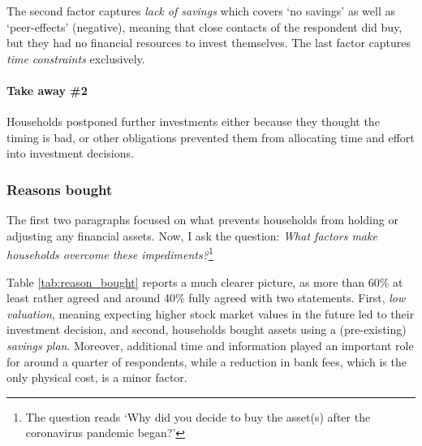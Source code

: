 \documentclass[ProjectABM]{subfiles}
\begin{document}
The second factor captures \textit{lack of savings} which covers `no savings' as well as `peer-effects' (negative), meaning that close contacts of the respondent did buy, but they had no financial resources to invest themselves. The last factor captures \textit{time constraints} exclusively.




\paragraph{Take away \#2}
Households postponed further investments either because they thought the timing is bad, or other obligations prevented them from allocating time and effort into investment decisions. %

\subsubsection{Reasons bought}
The first two paragraphs focused on what prevents households from holding or adjusting any financial assets. Now, I ask the question: \textit{What factors make households overcome these impediments?}\footnote{The question reads `Why did you decide to buy the asset(s) after the coronavirus pandemic began?'}



Table \ref{tab:reason_bought} reports a much clearer picture, as more than 60\% at least rather agreed and around 40\% fully agreed with two statements. First, \textit{low valuation}, meaning expecting higher stock market values in the future led to their investment decision, and second, households bought assets using a (pre-existing) \textit{savings plan}. %
Moreover, additional time and information played an important role for around a quarter of respondents, while a reduction in bank fees, which is the only physical cost, is a minor factor. %
\end{document}
